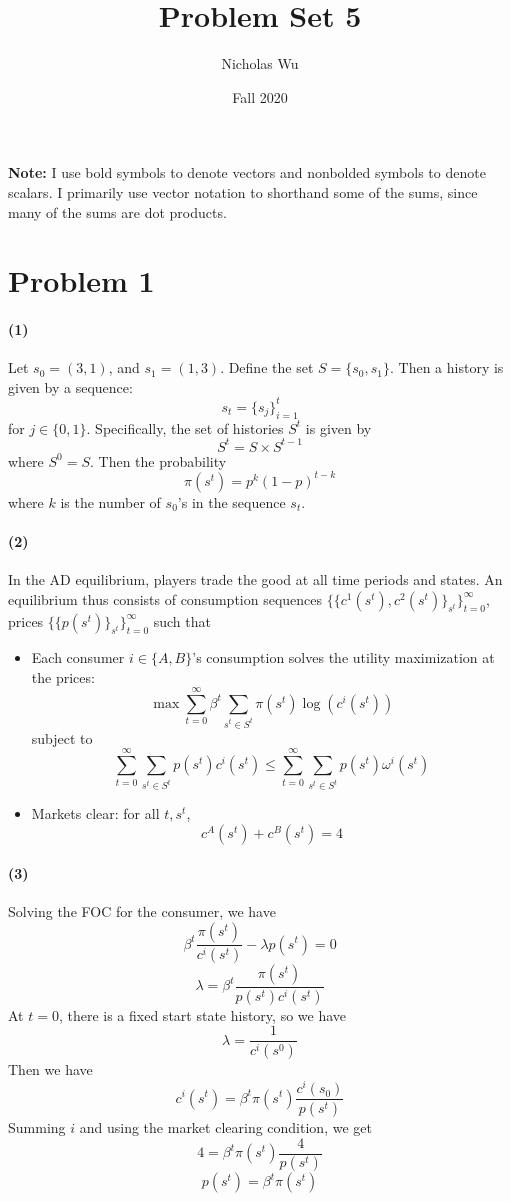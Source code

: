 \documentclass[10pt,letter]{article}
\newcommand{\problem}[1]{\section*{Problem #1}}
\newcommand{\problempart}[1]{\paragraph{#1}}
\begin{document}


\title{Problem Set 5}

\author{Nicholas Wu}

\date{Fall 2020}

\maketitle
\textbf{Note:} I use bold symbols to denote vectors and nonbolded symbols to denote scalars. I primarily use vector notation to shorthand some of the sums, since many of the sums are dot products.

\problem{1}

\problempart{(1)}
Let $s_0 = (3, 1)$, and $s_1 = (1,3)$. Define the set $S = \{ s_0, s_1 \}$. Then a history is given by a sequence:
\[ s_t = \{ s_j \}_{i=1}^t \]
for $j \in \{ 0, 1 \}$. Specifically, the set of histories $S^t$ is given by
\[ S^t = S \times S^{t-1} \]
where $S^0 = S$. Then the probability
\[ \pi(s^t) = p^k (1-p)^{t - k} \]
where $k$ is the number of $s_0$'s in the sequence $s_t$.
\problempart{(2)} In the AD equilibrium, players trade the good at all time periods and states. An equilibrium thus consists of consumption sequences $ \{ \{ c^1(s^t), c^2(s^t) \}_{s^t} \}_{t=0}^\infty $, prices $\{ \{ p(s^t) \}_{s^t} \}_{t=0}^\infty$
such that
\begin{itemize}
\item Each consumer $i \in \{A, B \}$'s consumption solves the utility maximization at the prices:
\[ \max \sum_{t=0}^\infty \beta^t \sum_{s^t \in S^t} \pi(s^t) \log(c^i(s^t)) \]
subject to
\[ \sum_{t=0}^\infty \sum_{s^t \in S^t} p(s^t) c^i(s^t) \le \sum_{t=0}^\infty \sum_{s^t \in S^t} p(s^t) \omega^i(s^t) \]
\item Markets clear: for all $t, s^t$,
\[ c^A(s^t) + c^B(s^t) = 4 \]
\end{itemize}
\problempart{(3)}
Solving the FOC for the consumer, we have
\[ \beta^t\frac{\pi(s^t)}{c^i(s^t)} - \lambda p(s^t) = 0 \]
\[ \lambda = \beta^t\frac{\pi(s^t)}{p(s^t)c^i(s^t)} \]
At $t=0$, there is a fixed start state history, so we have
\[ \lambda = \frac{1}{c^i(s^0)} \]
Then we have
\[  c^i(s^t) = \beta^t \pi(s^t) \frac{c^i(s_0)}{p(s^t)} \]
Summing $i$ and using the market clearing condition, we get
\[  4 = \beta^t \pi(s^t) \frac{4}{p(s^t)} \]
\[ p(s^t) = \beta^t \pi(s^t) \]
\end{document}
